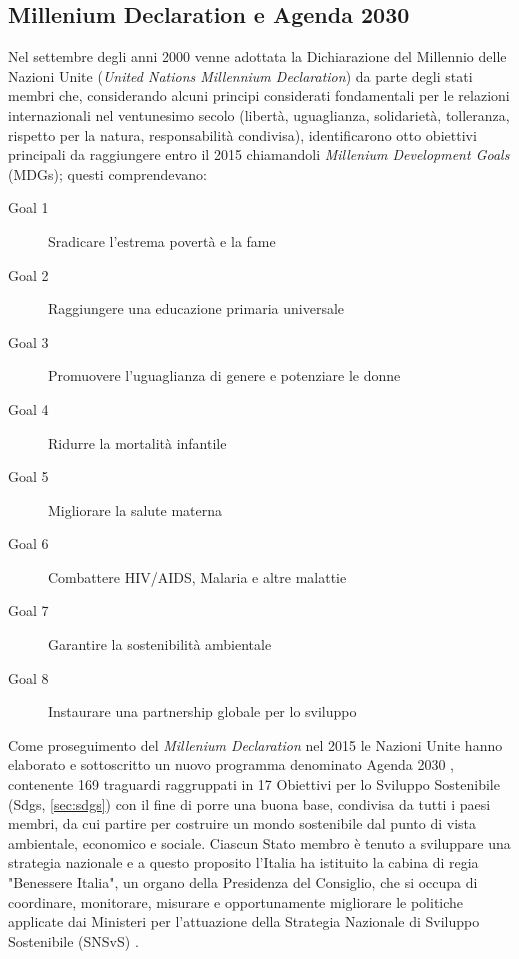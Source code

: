 \subsection{Millenium Declaration e Agenda 2030}
Nel settembre degli anni 2000 venne adottata la Dichiarazione del Millennio delle Nazioni Unite (\textit{United Nations Millennium Declaration}) \cite{millennium_declaration} da parte degli stati membri che, considerando alcuni principi considerati fondamentali per le relazioni internazionali nel ventunesimo secolo (libertà, uguaglianza, solidarietà, tolleranza, rispetto per la natura, responsabilità condivisa), identificarono otto obiettivi principali da raggiungere entro il 2015 chiamandoli \textit{Millenium Development Goals} (MDGs); questi comprendevano:
\begin{description}
    \item[Goal 1] Sradicare l'estrema povertà e la fame
    \item[Goal 2] Raggiungere una educazione primaria universale
    \item[Goal 3] Promuovere l'uguaglianza di genere e potenziare le donne
    \item[Goal 4] Ridurre la mortalità infantile
    \item[Goal 5] Migliorare la salute materna
    \item[Goal 6] Combattere HIV/AIDS, Malaria e altre malattie
    \item[Goal 7] Garantire la sostenibilità ambientale
    \item[Goal 8] Instaurare una partnership globale per lo sviluppo
\end{description}

Come proseguimento del \textit{Millenium Declaration} nel 2015 le Nazioni Unite hanno elaborato e sottoscritto un nuovo programma denominato Agenda 2030 \cite{agenda2030}, contenente 169 traguardi raggruppati in 17 Obiettivi per lo Sviluppo Sostenibile (Sdgs, \ref{sec:sdgs}) con il fine di porre una buona base, condivisa da tutti i paesi membri, da cui partire per costruire un mondo sostenibile dal punto di vista ambientale, economico e sociale.
%
Ciascun Stato membro è tenuto a sviluppare una strategia nazionale e a questo proposito l'Italia ha istituito la cabina di regia "Benessere Italia", un organo della Presidenza del Consiglio, che si occupa di coordinare, monitorare, misurare e opportunamente migliorare le politiche applicate dai Ministeri per l'attuazione della Strategia Nazionale di Sviluppo Sostenibile (SNSvS) \cite{SNSvS}.

